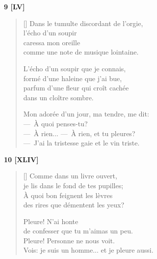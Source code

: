 \documentclass[a4paper,12pt]{book}
\begin{document}
\bigskip

\begin{center}
  \textbf{9 [LV]}
\end{center}

\settowidth{\versewidth}{---~À rien... --~À rien, et tu pleures? --~J'ai la tristesse}

\begin{verse}[\versewidth]
  Dans le tumulte discordant de l'orgie, \\
  l'écho d'un soupir \\
  caressa mon oreille \\
  comme une note de musique lointaine.

  L'écho d'un soupir que je connais, \\
  formé d'une haleine que j'ai bue, \\
  parfum d'une fleur qui croît cachée \\
  dans un cloître sombre.

  Mon adorée d'un jour, ma tendre, me dit: \\
  ---~À quoi penses-tu? \\
  ---~À rien... ---~À rien, et tu pleures? \\
  ---~J'ai la tristesse gaie et le vin triste.
\end{verse}

\bigskip

\begin{center}
  \textbf{10 [XLIV]}
\end{center}

\settowidth{\versewidth}{Vois: je suis un homme... et je pleure aussi!}

\begin{verse}[\versewidth]
  Comme dans un livre ouvert, \\
  je lis dans le fond de tes pupilles; \\
  À quoi bon feignent les lèvres \\
  des rires que démentent les yeux?

  Pleure! N'ai honte \\
  de confesser que tu m'aimas un peu. \\
  Pleure! Personne ne nous voit. \\
  Vois: je suis un homme... et je pleure aussi.
\end{verse}
\end{document}
